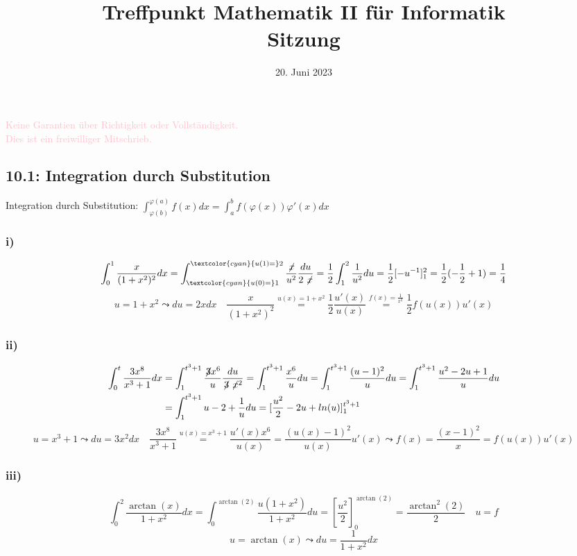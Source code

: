 \documentclass[
    accentcolor=pink,
    boxarc,
    dark_mode,
    logofile=enmpty
]{rubos-tuda-template}
\date{20. Juni 2023}
\title[trans rights <3]{Treffpunkt Mathematik II für Informatik \\ Sitzung \getSheetnumber{}}
\begin{document}
    \maketitle{}

    \begin{anmerkung}
        \huge{\textcolor{pink}{Keine Garantien über Richtigkeit oder Vollständigkeit. \\ Dies ist ein freiwilliger Mitschrieb.}}
    \end{anmerkung}

    \subsection*{10.1: Integration durch Substitution}
    Integration durch Substitution: $\displaystyle{\int_{\varphi(b)}^{\varphi(a)}f(x)dx = \int_{a}^{b}f(\varphi(x))\varphi'(x)dx}$

    \subsubsection*{i)}
    \[\int_{0}^{1}\frac{x}{(1+x^2)^2}dx = \int_{\textcolor{cyan}{u(0)=}1}^{\textcolor{cyan}{u(1)=}2} \frac{\not\!x}{u^2} \frac{du}{2\not\!x} = \frac{1}{2} \int_{1}^{2} \frac{1}{u^2}du=\frac{1}{2}[-u^{-1}]_1^2=\frac{1}{2}(-\frac{1}{2}+1)=\frac{1}{4}\]
    \[u = 1 + x^2 \leadsto du = 2xdx \quad \frac{x}{(1+x^2)^2} \overset{u(x) = 1 + x^2}{=} \frac{1}{2}\frac{u'(x)}{u(x)} \overset{f(x) = \frac{1}{x^2}}{=} \frac{1}{2}f(u(x))u'(x)\]

    \subsubsection*{ii)}
    \begin{align*}
        \int_{0}^{t}\frac{3x^8}{x^3+1}dx & =\int_{1}^{t^3+1}\frac{\not\!3x^6}{u}\frac{du}{\not\!3\not\!x^2}=\int_{1}^{t^3+1}\frac{x^6}{u}du=\int_{1}^{t^3+1}\frac{(u-1)^2}{u}du=\int_{1}^{t^3+1}\frac{u^2-2u+1}{u}du \\
                                         & =\int_{1}^{t^3+1}u-2+\frac{1}{u}du=[\frac{u^2}{2}-2u+ln(u)]_1^{t^3+1}
    \end{align*}
    \[u = x^3+1 \leadsto du=3x^2dx \quad \frac{3x^8}{x^3+1} \overset{u(x)=x^3+1}{=}\frac{u'(x)x^6}{u(x)}=\frac{(u(x)-1)^2}{u(x)}u'(x)\leadsto f(x)=\frac{(x-1)^2}{x}=f(u(x))u'(x)\]

    \subsubsection*{iii)}
    \[\int_{0}^{2}\frac{\arctan(x)}{1+x^2}dx=\int_{0}^{\arctan(2)}\frac{u(1+x^2)}{1+x^2}du=[\frac{u^2}{2}]_0^{\arctan(2)}=\frac{\arctan^2(2)}{2} \quad u=f\]
    \[u=\arctan(x) \leadsto du=\frac{1}{1+x^2}dx\]
\end{document}
